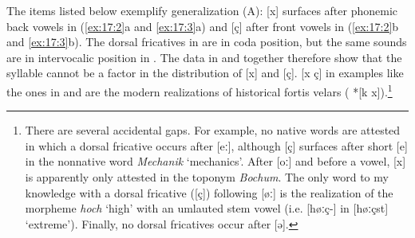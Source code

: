 The items listed below exemplify generalization (A): [x] surfaces after phonemic back vowels in (\ref{ex:17:2}a and \ref{ex:17:3}a) and [ç] after front vowels in (\ref{ex:17:2}b and \ref{ex:17:3}b). The dorsal fricatives in  are in coda position, but the same sounds are in intervocalic position in . The data in  and  together therefore show that the syllable cannot be a factor in the distribution of [x] and [ç]. [x ç] in examples like the ones in  and  are the modern realizations of historical fortis velars ( *[k x]).\footnote{{There are several accidental gaps. For example, no native words are attested in which a dorsal fricative occurs after [eː], although [ç] surfaces after short [e] in the nonnative word} \textrm{\textit{Mechanik}} \textrm{‘mechanics’. After [oː] and before a vowel, [x] is apparently only attested in the toponym} \textrm{\textit{Bochum}}\textrm{. The only word to my knowledge with a dorsal fricative ([ç]) following [øː] is the realization of the morpheme} \textrm{\textit{hoch}} \textrm{‘high’ with an umlauted stem vowel (i.e. [høːç-] in [høːçst] ‘extreme’). Finally, no dorsal fricatives occur after [ə].}}\pagebreak\largerpage

